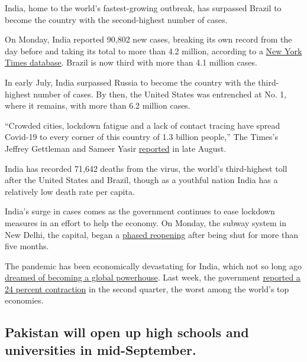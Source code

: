 India, home to the world's fastest-growing outbreak, has surpassed
Brazil to become the country with the second-highest number of cases.

On Monday, India reported 90,802 new cases, breaking its own record from
the day before and taking its total to more than 4.2 million, according
to a
\href{https://www.nytimes3xbfgragh.onion/interactive/2020/world/asia/india-coronavirus-cases.html}{New
York Times database}. Brazil is now third with more than 4.1 million
cases.

In early July, India surpassed Russia to become the country with the
third-highest number of cases. By then, the United States was entrenched
at No. 1, where it remains, with more than 6.2 million cases.

``Crowded cities, lockdown fatigue and a lack of contact tracing have
spread Covid-19 to every corner of this country of 1.3 billion people,''
The Times's Jeffrey Gettleman and Sameer Yasir
\href{https://www.nytimes3xbfgragh.onion/2020/08/28/world/asia/india-coronavirus.html}{reported}
in late August.

India has recorded 71,642 deaths from the virus, the world's
third-highest toll after the United States and Brazil, though as a
youthful nation India has a relatively low death rate per capita.

India's surge in cases comes as the government continues to ease
lockdown measures in an effort to help the economy. On Monday, the
subway system in New Delhi, the capital, began a
\href{http://www.delhimetrorail.com/press_reldetails.aspx?id=YEUIu1E8HMklld}{phased
reopening} after being shut for more than five months.

The pandemic has been economically devastating for India, which not so
long ago
\href{https://www.nytimes3xbfgragh.onion/2020/09/05/world/asia/india-economy-coronavirus.html}{dreamed
of becoming a global powerhouse}. Last week, the government
\href{https://www.nytimes3xbfgragh.onion/2020/08/31/world/asia/india-economy-gdp.html}{reported
a 24 percent contraction} in the second quarter, the worst among the
world's top economies.

\hypertarget{pakistan-will-open-up-high-schools-and-universities-in-mid-september}{%
\subsection{Pakistan will open up high schools and universities in
mid-September.}\label{pakistan-will-open-up-high-schools-and-universities-in-mid-september}}

